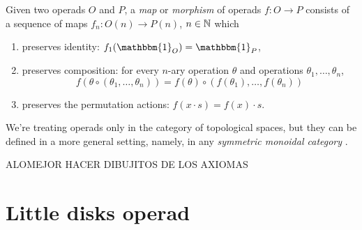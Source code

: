 \documentclass[TFM.tex]{subfiles}
\begin{document}

\begin{defi}
Given two operads $O$ and $P$, a \emph{map} or \emph{morphism} of operads $f:O\to P$ consists of a sequence of maps $f_n:O(n)\to P(n)$, $n\in\mathbb{N}$ which
\begin{enumerate}
\item preserves identity: $f_1(\mathbbm{1}_O)=\mathbbm{1}_P$,
\item preserves composition: for every $n$-ary operation $\theta$ and operations $\theta_1,\dots, \theta_n$,
\[
f(\theta\circ(\theta_1,\ldots,\theta_n))
= f(\theta)\circ(f(\theta_1),\ldots,f(\theta_n))
\]
\item  preserves the permutation actions: $f(x\cdot s)=f(x)\cdot s$.
\end{enumerate}
\end{defi}

We're treating operads only in the category of topological spaces, but they can be defined in a more general setting, namely, in any \emph{symmetric monoidal category} \cite{Yau}.

ALOMEJOR HACER DIBUJITOS DE LOS AXIOMAS


\section{Little disks operad}
\end{document}
